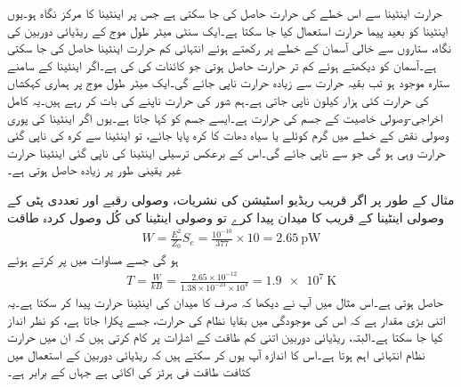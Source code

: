 حرارت اینٹینا سے اس خطے کی حرارت حاصل کی جا سکتی ہے جس پر اینٹینا کا مرکز نگاہ ہو۔یوں اینٹینا کو بعید پیما حرارت استعمال کیا جا سکتا ہے۔ایک سنٹی میٹر طول موج کے ریڈیائی دوربین کی نگاہ، ستاروں سے خالی آسمان کے خطے پر رکھتے ہوئے انتہائی کم حرارت اینٹینا   حاصل کی جا سکتی ہے۔آسمان کو دیکھتے ہوئے کم تر حرارت  حاصل ہوتی جو کائنات کی  کی  ہے۔اگر اینٹینا کے سامنے ستارہ موجود ہو تب بقیہ حرارت سے زیادہ حرارت ناپی جائے گی۔ایک میٹر طول موج پر ہماری کہکشاں کی حرارت کئی ہزار کیلون ناپی جاتی ہے۔ہم  شور کی حرارت ناپنے کی بات کر رہے ہیں۔یہ کامل اخراجی-وصولی خاصیت کے جسم کی حرارت ہے۔ایسے جسم کو   کہا جاتا ہے۔یوں اگر اینٹینا کی پوری وصولی نقش کے خطے میں گرم کوئلے یا سیاہ دھات کا کرہ پایا جائے، تو اینٹینا سے کرہ کی ناپی گئی حرارت وہی ہو گی جو  سے ناپی جائے گی۔اس کے  برعکس ترسیلی اینٹینا کی ناپی گئی اینٹینا حرارت غیر یقینی طور پر زیادہ حاصل ہوتی ہے۔   

مثال کے طور پر  اگر قریب ریڈیو اسٹیشن کی نشریات،  وصولی رقبے اور  تعددی پٹی کے وصولی اینٹینا کے قریب  کا میدان پیدا کرے تو وصولی اینٹینا کی کُل وصول کردہ طاقت
\begin{align*}
W=\frac{E^2}{Z_0} S_e=\frac{10^{-10}}{377} \times 10=\SI{2.65}{\pico \watt}
\end{align*}
ہو گی جسے مساوات  میں پر کرتے ہوئے
\begin{align*}
T=\frac{W}{k B}=\frac{2.65\times 10^{-12}}{1.38\times 10^{-23}\times 10^4}=\SI{1.9e7}{\kelvin}
\end{align*}
حاصل ہوتی ہے۔اس مثال میں آپ نے دیکھا کہ صرف  کا میدان   کی اینٹینا حرارت پیدا کر سکتا ہے۔یہ اتنی بڑی مقدار ہے کہ اس کی موجودگی میں بقایا نظام کی حرارت، جسے  پکارا جاتا ہے، کو نظر انداز کیا جا سکتا ہے۔البتہ، ریڈیائی دوربین اتنی کم طاقت کے اشارات پر کام کرتی ہیں کہ ان میں حرارت نظام انتہائی اہم ہوتا ہے۔اس کا اندازہ آپ یوں کر سکتے ہیں کہ ریڈیائی دوربین کے استعمال میں کثافت طاقت فی ہرٹز کی اکائی  ہے جہاں  کے برابر ہے۔

